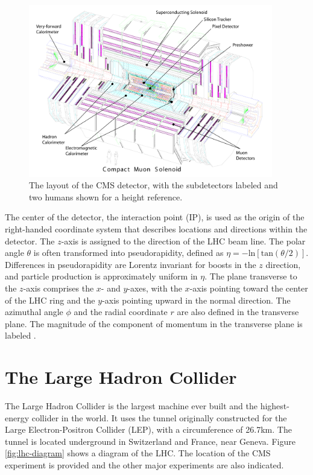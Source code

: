 \documentclass[12pt]{thesis}  %
\begin{document}
\begin{figure}[hbt]
\begin{center}
\includegraphics[width=0.95\textwidth]{figures/cms_complete_labelled.pdf}
\caption{The layout of the CMS detector, with the subdetectors labeled and two humans shown for a height reference.}
\label{fig:cms-overall}
\end{center}
\end{figure}

The center of the detector, the interaction point (IP), is used as the origin of the right-handed coordinate system that describes locations and directions within the detector. The $z$-axis is assigned to the direction of the LHC beam line. The polar angle $\theta$ is often transformed into pseudorapidity, defined as $\eta = -\text{ln}[\text{tan}(\theta/2)]$. Differences in pseudorapidity are Lorentz invariant for boosts in the $z$ direction, and particle production is approximately uniform in $\eta$. The plane transverse to the $z$-axis comprises the $x$- and $y$-axes, with the $x$-axis pointing toward the center of the LHC ring and the $y$-axis pointing upward in the normal direction. The azimuthal angle $\phi$ and the radial coordinate $r$ are also defined in the transverse plane. The magnitude of the component of momentum in the transverse plane is labeled \pt.

\section{The Large Hadron Collider}

The Large Hadron Collider is the largest machine ever built and the highest-energy collider in the world. It uses the tunnel originally constructed for the Large Electron-Positron Collider (LEP), with a circumference of 26.7\unit{km}. The tunnel is located underground in Switzerland and France, near Geneva. Figure \ref{fig:lhc-diagram} shows a diagram of the LHC. The location of the CMS experiment is provided and the other major experiments are also indicated.
\end{document}
